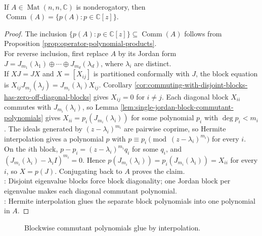 \begin{theorem} \label{thm:nonderogatory-commutant-polynomials} \\
If $A\in\operatorname{Mat}(n,n,\mathbb{C})$ is nonderogatory, then $\operatorname{Comm}(A)=\{p(A):p\in\mathbb{C}[z]\}$.
\begin{proof}
The inclusion $\{p(A):p\in\mathbb{C}[z]\}\subseteq\operatorname{Comm}(A)$ follows from Proposition \ref{prop:operator-polynomial-products}.\\
For reverse inclusion, first replace $A$ by its Jordan form $J=J_{m_1}(\lambda_1)\oplus\cdots\oplus J_{m_d}(\lambda_d)$, where $\lambda_i$ are distinct.\\
If $XJ=JX$ and $X=[X_{ij}]$ is partitioned conformally with $J$, the block equation is $X_{ij}J_{m_j}(\lambda_j)=J_{m_i}(\lambda_i)X_{ij}$. Corollary \ref{cor:commuting-with-disjoint-blocks-has-zero-off-diagonal-blocks} gives $X_{ij}=0$ for $i\neq j$. Each diagonal block $X_{ii}$ commutes with $J_{m_i}(\lambda_i)$, so Lemma \ref{lem:single-jordan-block-commutant-polynomials} gives $X_{ii}=p_i(J_{m_i}(\lambda_i))$ for some polynomial $p_i$ with $\deg p_i<m_i$. The ideals generated by $(z-\lambda_i)^{m_i}$ are pairwise coprime, so Hermite interpolation gives a polynomial $p$ with $p\equiv p_i\pmod{(z-\lambda_i)^{m_i}}$ for every $i$.\\
On the $i$th block, $p-p_i=(z-\lambda_i)^{m_i}q_i$ for some $q_i$, and $(J_{m_i}(\lambda_i)-\lambda_iI)^{m_i}=0$. Hence $p(J_{m_i}(\lambda_i))=p_i(J_{m_i}(\lambda_i))=X_{ii}$ for every $i$, so $X=p(J)$. Conjugating back to $A$ proves the claim.\\
: Disjoint eigenvalue blocks force block diagonality; one Jordan block per eigenvalue makes each diagonal commutant polynomial.\\
: Hermite interpolation glues the separate block polynomials into one polynomial in $A$.
\end{proof}
\end{theorem}

\begin{figure}[H]
  \centering
  
  \caption{Blockwise commutant polynomials glue by interpolation.}
  \label{fig:nonderogatory-commutant-polynomial}
\end{figure}

